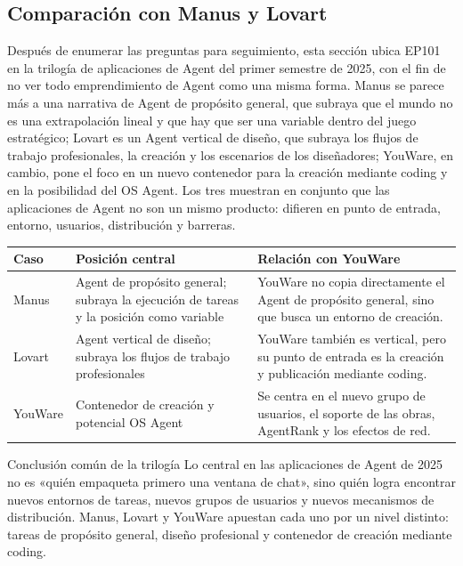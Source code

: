 \documentclass[a4paper]{article}
\begin{document}
\subsection{Comparación con Manus y Lovart}

Después de enumerar las preguntas para seguimiento, esta sección ubica EP101 en la trilogía de aplicaciones de Agent del primer semestre de 2025, con el fin de no ver todo emprendimiento de Agent como una misma forma. Manus se parece más a una narrativa de Agent de propósito general, que subraya que el mundo no es una extrapolación lineal y que hay que ser una variable dentro del juego estratégico; Lovart es un Agent vertical de diseño, que subraya los flujos de trabajo profesionales, la creación y los escenarios de los diseñadores; YouWare, en cambio, pone el foco en un nuevo contenedor para la creación mediante coding y en la posibilidad del OS Agent. Los tres muestran en conjunto que las aplicaciones de Agent no son un mismo producto: difieren en punto de entrada, entorno, usuarios, distribución y barreras.

\noindent\begin{tabularx}{\textwidth}{p{}p{}X}
\toprule
Caso & Posición central & Relación con YouWare \\
\midrule
Manus & Agent de propósito general; subraya la ejecución de tareas y la posición como variable & YouWare no copia directamente el Agent de propósito general, sino que busca un entorno de creación. \\
Lovart & Agent vertical de diseño; subraya los flujos de trabajo profesionales & YouWare también es vertical, pero su punto de entrada es la creación y publicación mediante coding. \\
YouWare & Contenedor de creación y potencial OS Agent & Se centra en el nuevo grupo de usuarios, el soporte de las obras, AgentRank y los efectos de red. \\
\bottomrule
\end{tabularx}

\begin{importantbox}{Conclusión común de la trilogía}
Lo central en las aplicaciones de Agent de 2025 no es «quién empaqueta primero una ventana de chat», sino quién logra encontrar nuevos entornos de tareas, nuevos grupos de usuarios y nuevos mecanismos de distribución. Manus, Lovart y YouWare apuestan cada uno por un nivel distinto: tareas de propósito general, diseño profesional y contenedor de creación mediante coding.
\end{importantbox}
\end{document}
